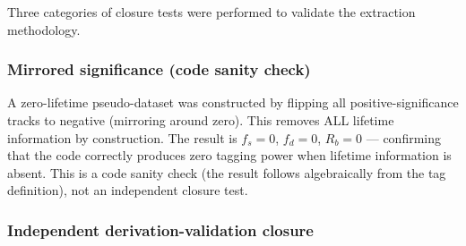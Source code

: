 \documentclass[11pt,a4paper]{article}
\begin{document}
Three categories of closure tests were performed to validate the extraction methodology.

\subsubsection{Mirrored significance (code sanity check)}

A zero-lifetime pseudo-dataset was constructed by flipping all positive-significance
tracks to negative (mirroring around zero). This removes ALL lifetime information by
construction. The result is $f_s = 0$, $f_d = 0$, $R_b = 0$ --- confirming that the
code correctly produces zero tagging power when lifetime information is absent. This is a
code sanity check (the result follows algebraically from the tag definition), not an
independent closure test.

\subsubsection{Independent derivation-validation closure}
\end{document}
